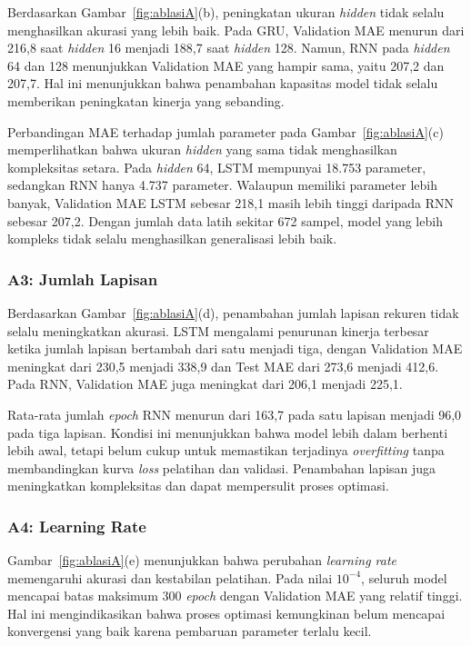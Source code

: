 \documentclass[conference,a4paper]{IEEEtran}
\begin{document}
Berdasarkan Gambar~\ref{fig:ablasiA}(b), peningkatan ukuran \textit{hidden} tidak selalu menghasilkan akurasi yang lebih baik. Pada GRU, Validation MAE menurun dari 216,8 saat \textit{hidden} 16 menjadi 188,7 saat \textit{hidden} 128. Namun, RNN pada \textit{hidden} 64 dan 128 menunjukkan Validation MAE yang hampir sama, yaitu 207,2 dan 207,7. Hal ini menunjukkan bahwa penambahan kapasitas model tidak selalu memberikan peningkatan kinerja yang sebanding.

Perbandingan MAE terhadap jumlah parameter pada Gambar~\ref{fig:ablasiA}(c) memperlihatkan bahwa ukuran \textit{hidden} yang sama tidak menghasilkan kompleksitas setara. Pada \textit{hidden} 64, LSTM mempunyai 18.753 parameter, sedangkan RNN hanya 4.737 parameter. Walaupun memiliki parameter lebih banyak, Validation MAE LSTM sebesar 218,1 masih lebih tinggi daripada RNN sebesar 207,2. Dengan jumlah data latih sekitar 672 sampel, model yang lebih kompleks tidak selalu menghasilkan generalisasi lebih baik.

\subsubsection{A3: Jumlah Lapisan}

Berdasarkan Gambar~\ref{fig:ablasiA}(d), penambahan jumlah lapisan rekuren tidak selalu meningkatkan akurasi. LSTM mengalami penurunan kinerja terbesar ketika jumlah lapisan bertambah dari satu menjadi tiga, dengan Validation MAE meningkat dari 230,5 menjadi 338,9 dan Test MAE dari 273,6 menjadi 412,6. Pada RNN, Validation MAE juga meningkat dari 206,1 menjadi 225,1.

Rata-rata jumlah \textit{epoch} RNN menurun dari 163,7 pada satu lapisan menjadi 96,0 pada tiga lapisan. Kondisi ini menunjukkan bahwa model lebih dalam berhenti lebih awal, tetapi belum cukup untuk memastikan terjadinya \textit{overfitting} tanpa membandingkan kurva \textit{loss} pelatihan dan validasi. Penambahan lapisan juga meningkatkan kompleksitas dan dapat mempersulit proses optimasi.

\subsubsection{A4: Learning Rate}

Gambar~\ref{fig:ablasiA}(e) menunjukkan bahwa perubahan \textit{learning rate} memengaruhi akurasi dan kestabilan pelatihan. Pada nilai $10^{-4}$, seluruh model mencapai batas maksimum 300 \textit{epoch} dengan Validation MAE yang relatif tinggi. Hal ini mengindikasikan bahwa proses optimasi kemungkinan belum mencapai konvergensi yang baik karena pembaruan parameter terlalu kecil.
\end{document}
